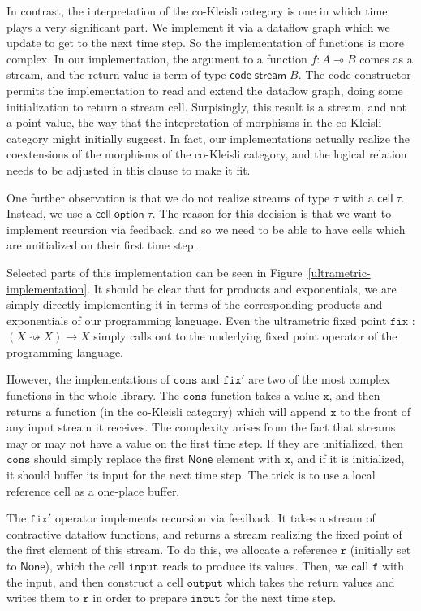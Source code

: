 \documentclass[nocopyrightspace,preprint]{sigplanconf}
\newcommand{\term}[1]{\ensuremath{\mathtt{{#1}}}}
\newcommand{\shrink}{\rightsquigarrow}
\newcommand{\celltype}[1]{\mathsf{cell}\;{#1}}
\newcommand{\opttype}[1]{\mathsf{option}\;{#1}}
\newcommand{\comp}[1]{\mathsf{code}\;{#1}}
\newcommand{\streamtype}[1]{\mathsf{stream}\;{#1}}
\newcommand{\lolli}{\multimap}
\newcommand{\None}{\mathsf{None}}
\begin{document}
In contrast, the interpretation of the co-Kleisli category is one in
which time plays a very significant part. We implement it via a
dataflow graph which we update to get to the next time step. So the
implementation of functions is more complex. In our implementation,
the argument to a function $f : A \lolli B$ comes as a stream, and the
return value is term of type $\comp{\streamtype{B}}$. The code
constructor permits the implementation to read and extend the dataflow
graph, doing some initialization to return a stream cell. Surpisingly,
this result is a stream, and not a point value, the way that the
intepretation of morphisms in the co-Kleisli category might initially
suggest. In fact, our implementations actually realize the coextensions
of the morphisms of the co-Kleisli category, and the logical relation
needs to be adjusted in this clause to make it fit. 

One further observation is that we do not realize streams of type $\tau$
with a $\celltype{\tau}$. Instead, we use a $\celltype{\opttype{\tau}}$. 
The reason for this decision is that we want to implement recursion via
feedback, and so we need to be able to have cells which are unitialized
on their first time step. 

Selected parts of this implementation can be seen in
Figure~\ref{ultrametric-implementation}. It should be clear that for
products and exponentials, we are simply directly implementing it in
terms of the corresponding products and exponentials of our
programming language. Even the ultrametric fixed point \term{fix} :
$(X \shrink X) \to X$ simply calls out to the underlying fixed point
operator of the programming language. 

However, the implementations of \term{cons} and \term{fix'} are two of
the most complex functions in the whole library. The \term{cons}
function takes a value \term{x}, and then returns a function (in the
co-Kleisli category) which will append \term{x} to the front of any
input stream it receives. The complexity arises from the fact that
streams may or may not have a value on the first time step. If they
are unitialized, then \term{cons} should simply replace the first
$\None$ element with \term{x}, and if it is initialized, it should
buffer its input for the next time step. The trick is to use a local
reference cell as a one-place buffer. 

The $\term{fix'}$ operator implements recursion via feedback. It takes
a stream of contractive dataflow functions, and returns a stream
realizing the fixed point of the first element of this stream. To do
this, we allocate a reference \term{r} (initially set to $\None$), which
the cell \term{input} reads to produce its values. Then, we call \term{f}
with the input, and then construct a cell \term{output} which takes the
return values and writes them to \term{r} in order to prepare \term{input}
for the next time step. 
\end{document}
